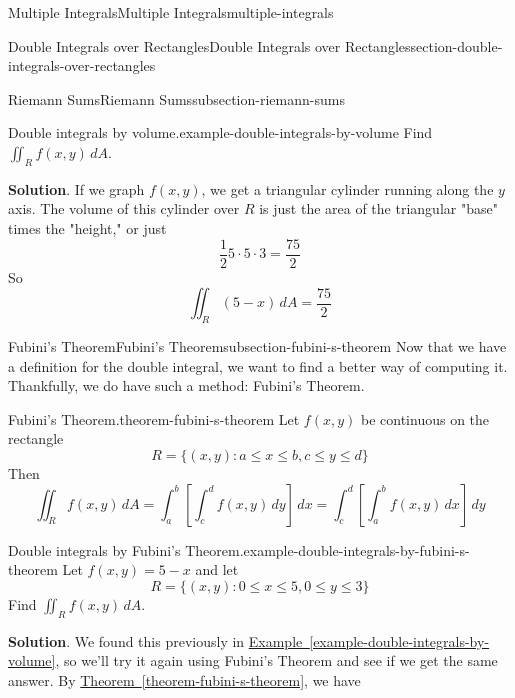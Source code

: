 \documentclass[oneside,10pt,]{book}
\numberwithin{equation}{section}
\begin{document}
\begin{chapterptx}{Multiple Integrals}{}{Multiple Integrals}{}{}{multiple-integrals}
\begin{sectionptx}{Double Integrals over Rectangles}{}{Double Integrals over Rectangles}{}{}{section-double-integrals-over-rectangles}
\begin{subsectionptx}{Riemann Sums}{}{Riemann Sums}{}{}{subsection-riemann-sums}
\begin{example}{Double integrals by volume.}{example-double-integrals-by-volume}
Find \(\iint_{R}f(x,y)\,dA\).%
\par\smallskip%
\noindent\textbf{Solution}.\hypertarget{solution-238}{}\quad%
\hypertarget{p-1466}{}%
If we graph \(f(x,y)\), we get a triangular cylinder running along the \(y\) axis. The volume of this cylinder over \(R\) is just the area of the triangular "base" times the "height," or just%
\begin{equation*}
\frac{1}{2}5\cdot5\cdot3 = \frac{75}{2}
\end{equation*}
So%
\begin{equation*}
\iint_{R}(5-x)\,dA = \frac{75}{2}
\end{equation*}
%
\end{example}
\end{subsectionptx}
%
%
\typeout{************************************************}
\typeout{************************************************}
%
\begin{subsectionptx}{Fubini's Theorem}{}{Fubini's Theorem}{}{}{subsection-fubini-s-theorem}
\hypertarget{p-1467}{}%
Now that we have a definition for the double integral, we want to find a better way of computing it. Thankfully, we do have such a method: Fubini's Theorem.%
\begin{theorem}{Fubini's Theorem.}{}{theorem-fubini-s-theorem}%
\hypertarget{p-1468}{}%
Let \(f(x,y)\) be continuous on the rectangle%
\begin{equation*}
R = \{(x,y) : a\leq x\leq b, c\leq y\leq d\}
\end{equation*}
Then%
\begin{equation*}
\iint_{R}f(x,y)\,dA = \int_{a}^{b}\left[\int_{c}^{d}f(x,y)\,dy\right]\,dx = \int_{c}^{d}\left[\int_{a}^{b}f(x,y)\,dx\right]\,dy
\end{equation*}
%
\end{theorem}
\begin{example}{Double integrals by Fubini's Theorem.}{example-double-integrals-by-fubini-s-theorem}%
\hypertarget{p-1469}{}%
Let \(f(x,y) = 5 - x\) and let%
\begin{equation*}
R = \{(x,y) : 0\leq x\leq 5, 0\leq y\leq 3\}
\end{equation*}
Find \(\iint_{R}f(x,y)\,dA\).%
\par\smallskip%
\noindent\textbf{Solution}.\hypertarget{solution-239}{}\quad%
\hypertarget{p-1470}{}%
We found this previously in \hyperref[example-double-integrals-by-volume]{Example~\ref{example-double-integrals-by-volume}}, so we'll try it again using Fubini's Theorem and see if we get the same answer. By \hyperref[theorem-fubini-s-theorem]{Theorem~\ref{theorem-fubini-s-theorem}}, we have%

\end{example}
\end{subsectionptx}
\end{sectionptx}
\end{chapterptx}
\end{document}
